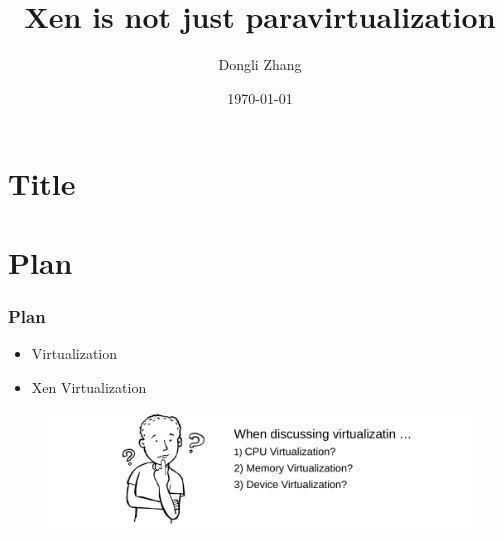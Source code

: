 \documentclass[aspectratio=169]{beamer}
\title[Xen is not just paravirtualization]{Xen is not just paravirtualization} %
\author{Dongli Zhang} %
\institute[Oracle] %
{
Oracle Asia Research and Development Centers (Beijing) \\ %
\medskip
\textit{dongli.zhang@oracle.com} %
}
\date{\today} %
\begin{document}

\section{Title}
\begin{frame}
\titlepage %
\end{frame}


\section{Plan}
\begin{frame}
\frametitle{Plan}
\begin{itemize}
\setlength\itemsep{1em}
\item {\large Virtualization}
\item {\large Xen Virtualization}
\end{itemize}
\pause
\begin{figure}
\includegraphics[width=1.0\linewidth]{figures/plan.pdf}
\end{figure}
\end{frame}

\end{document}
